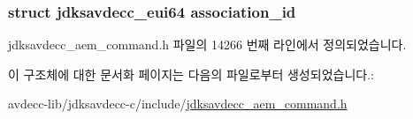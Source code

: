 \subsubsection[{\texorpdfstring{association\+\_\+id}{association_id}}]{\setlength{\rightskip}{0pt plus 5cm}struct {\bf jdksavdecc\+\_\+eui64} association\+\_\+id}\hypertarget{structjdksavdecc__aem__command__get__association__id__response_a0fa49c5118429af7a5ee7d71eada7b94}{}\label{structjdksavdecc__aem__command__get__association__id__response_a0fa49c5118429af7a5ee7d71eada7b94}


jdksavdecc\+\_\+aem\+\_\+command.\+h 파일의 14266 번째 라인에서 정의되었습니다.



이 구조체에 대한 문서화 페이지는 다음의 파일로부터 생성되었습니다.\+:\begin{DoxyCompactItemize}
\item 
avdecc-\/lib/jdksavdecc-\/c/include/\hyperlink{jdksavdecc__aem__command_8h}{jdksavdecc\+\_\+aem\+\_\+command.\+h}\end{DoxyCompactItemize}
